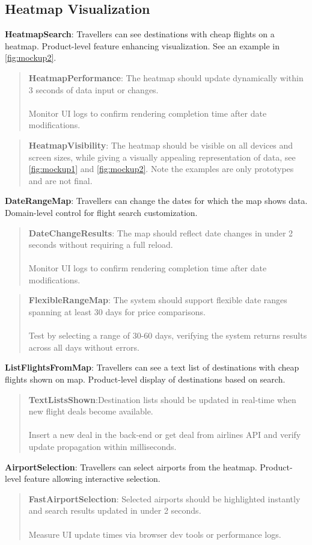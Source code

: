 \subsection{Heatmap Visualization}
\textbf{HeatmapSearch}: Travellers can see destinations with cheap flights on a heatmap.
    Product-level feature enhancing visualization. See an example in \autoref{fig:mockup2}.
    \begin{quote}
        \textbf{HeatmapPerformance}: The heatmap should update dynamically within 3 seconds of data input or changes. \\ \\
        Monitor UI logs to confirm rendering completion time after date modifications.
    \end{quote}
    \begin{quote}
        \textbf{HeatmapVisibility}: The heatmap should be visible on all devices and screen sizes, while giving a visually appealing representation of data, see \autoref{fig:mockup1} and \autoref{fig:mockup2}. Note the examples are only prototypes and are not final.
    \end{quote}
\textbf{DateRangeMap}: Travellers can change the dates for which the map shows data. Domain-level control for flight search customization.
    \begin{quote}
        \textbf{DateChangeResults}: The map should reflect date changes in under 2 seconds without requiring a full reload. \\ \\
        Monitor UI logs to confirm rendering completion time after date modifications.
    \end{quote}
\begin{quote}
    \textbf{FlexibleRangeMap}: The system should support flexible date ranges spanning at least 30 days for price comparisons. \\ \\
    Test by selecting a range of 30-60 days, verifying the system returns results across all days without errors.
\end{quote}
\textbf{ListFlightsFromMap}: Travellers can see a text list of destinations with cheap flights shown on map. Product-level display of destinations based on search.
    \begin{quote}
        \textbf{TextListsShown}:Destination lists should be updated in real-time when new flight deals become available. \\ \\
        Insert a new deal in the back-end or get deal from airlines API and verify update propagation within milliseconds.
    \end{quote}
\textbf{AirportSelection}: Travellers can select airports from the heatmap. Product-level feature allowing interactive selection.
\begin{quote}
    \textbf{FastAirportSelection}: Selected airports should be highlighted instantly and search results updated in under 2 seconds. \\ \\ 
    Measure UI update times via browser dev tools or performance logs.
\end{quote}

